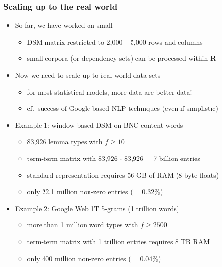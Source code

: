 \begin{frame}
  \frametitle{Scaling up to the real world}

  \begin{itemize}
  \item So far, we have worked on small 
    \begin{itemize}
    \item DSM matrix restricted to 2,000 -- 5,000 rows and columns
    \item small corpora (or dependency sets) can be processed within
      \textbf{R}
    \end{itemize}
    \pause
  \item Now we need to scale up to \h{real world} data sets
    \begin{itemize}
    \item for most statistical models, more data are better data!
    \item cf.\ success of Google-based NLP techniques (even if simplistic)
    \end{itemize}
    \pause
  \item Example 1: window-based DSM on BNC content words
    \begin{itemize}
    \item 83,926 lemma types with $f\geq 10$
    \item term-term matrix with 83,926 $\cdot$ 83,926 = 7 billion entries
    \item standard representation requires 56 GB of RAM (8-byte floats)%
      \pause
    \item only 22.1 million non-zero entries ($= 0.32\%$)
    \end{itemize}
    \pause
  \item Example 2: Google Web 1T 5-grams (1 trillion words)
    \begin{itemize}
    \item more than 1 million word types with $f\geq 2500$
    \item term-term matrix with 1 trillion entries requires 8 TB RAM
    \item only 400 million non-zero entries ($= 0.04\%$)
    \end{itemize}
  \end{itemize}
\end{frame}

